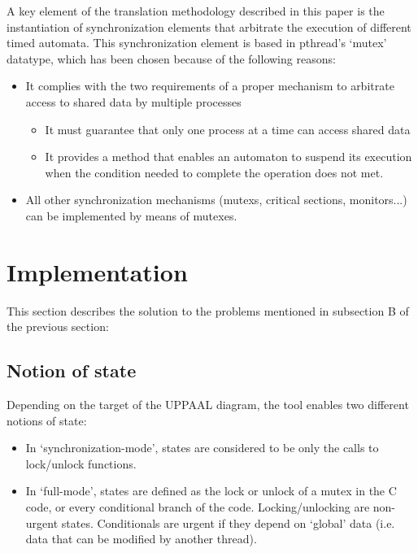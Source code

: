 \documentclass[conference]{IEEEtran}
\begin{document}
A key element of the translation methodology described in this paper is the instantiation of synchronization elements that arbitrate the execution of different timed automata. This synchronization element is based in pthread's `mutex' datatype, which has been chosen because of the following reasons:

\begin{itemize}
    \item It complies with the two requirements of a proper mechanism to arbitrate access to shared data by multiple processes \cite{philo_1}
    \begin{itemize}
        \item It must guarantee that only one process at a time can access shared data
        \item It provides a method that enables an automaton to suspend its execution when the condition needed to complete the operation does not met.
    \end{itemize}
    \item All other synchronization mechanisms (mutexs, critical sections, monitors...) can be implemented by means of mutexes.
\end{itemize}

 

\section{Implementation}

This section describes the solution to the problems mentioned in subsection B of the previous section:

\subsection{Notion of state}

Depending on the target of the UPPAAL diagram, the tool enables two different notions of state:

\begin{itemize}
\item In `synchronization-mode', states are considered to be only the calls to lock/unlock functions.
\item In `full-mode', states are defined as the lock or unlock of a mutex in the C code, or every conditional branch of the code. Locking/unlocking are non-urgent states. Conditionals are urgent if they depend on `global' data (i.e. data that can be modified by another thread).
\end{itemize}
\end{document}
